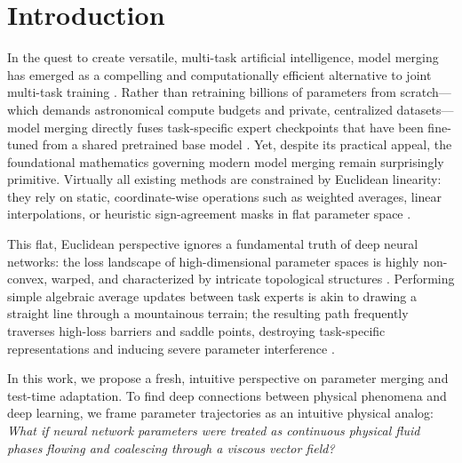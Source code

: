 \section{Introduction}
\label{sec:intro}

In the quest to create versatile, multi-task artificial intelligence, model merging has emerged as a compelling and computationally efficient alternative to joint multi-task training \cite{wortsman2022model, chen2024survey}. Rather than retraining billions of parameters from scratch—which demands astronomical compute budgets and private, centralized datasets—model merging directly fuses task-specific expert checkpoints that have been fine-tuned from a shared pretrained base model \cite{ilharco2023editing, yadav2024ties}. Yet, despite its practical appeal, the foundational mathematics governing modern model merging remain surprisingly primitive. Virtually all existing methods are constrained by Euclidean linearity: they rely on static, coordinate-wise operations such as weighted averages, linear interpolations, or heuristic sign-agreement masks in flat parameter space \cite{yadav2024ties, yu2023language}. 

This flat, Euclidean perspective ignores a fundamental truth of deep neural networks: the loss landscape of high-dimensional parameter spaces is highly non-convex, warped, and characterized by intricate topological structures \cite{li2018visualizing, fort2019deep}. Performing simple algebraic average updates between task experts is akin to drawing a straight line through a mountainous terrain; the resulting path frequently traverses high-loss barriers and saddle points, destroying task-specific representations and inducing severe parameter interference \cite{yang2024adamerging, zhang2024task}. 

In this work, we propose a fresh, intuitive perspective on parameter merging and test-time adaptation. To find deep connections between physical phenomena and deep learning, we frame parameter trajectories as an intuitive physical analog: \emph{What if neural network parameters were treated as continuous physical fluid phases flowing and coalescing through a viscous vector field?}

